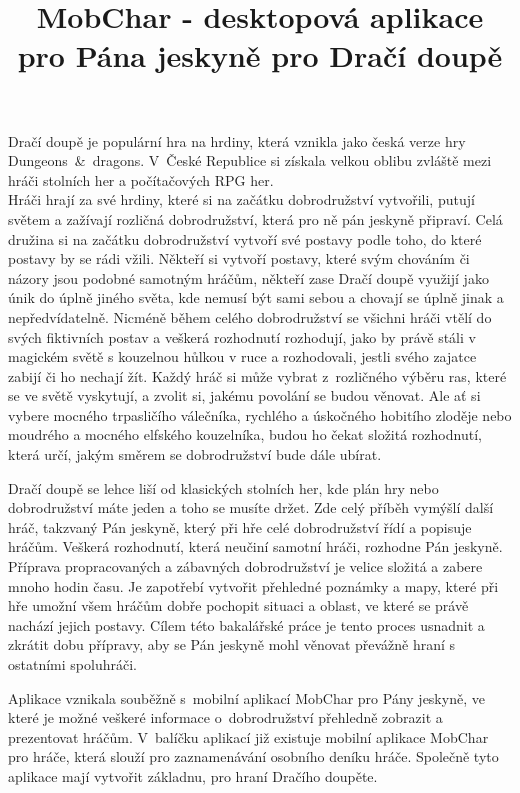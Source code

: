 \documentclass[thesis=B,czech]{resources/FITthesis}[2012/06/26]
\title{	MobChar - desktopová aplikace pro Pána jeskyně pro Dračí doupě}
\begin{document}

\begin{introduction}
Dračí doupě je populární hra na hrdiny, která vznikla jako česká verze hry Dungeons~\&~dragons. V~České Republice si získala velkou oblibu zvláště mezi hráči stolních her a počítačových RPG her.\\

Hráči hrají za své hrdiny, které si na začátku dobrodružství vytvořili, putují světem a zažívají rozličná dobrodružství, která pro ně pán jeskyně připraví. Celá družina si na začátku dobrodružství vytvoří své postavy podle toho, do které postavy by se rádi vžili. Někteří si vytvoří postavy, které svým chováním či názory jsou podobné samotným hráčům, někteří zase Dračí doupě využijí jako únik do úplně jiného světa, kde nemusí být sami sebou a chovají se úplně jinak a nepředvídatelně. Nicméně během celého dobrodružství se všichni hráči vtělí do svých fiktivních postav a veškerá rozhodnutí rozhodují, jako by právě stáli v magickém světě s kouzelnou hůlkou v ruce a rozhodovali, jestli svého zajatce zabijí či ho nechají žít.
Každý hráč si může vybrat z~rozličného výběru ras, které se ve světě vyskytují, a zvolit si, jakému povolání se budou věnovat. Ale ať si vybere mocného trpasličího válečníka, rychlého a úskočného hobitího zloděje nebo moudrého a mocného elfského kouzelníka, budou ho čekat složitá rozhodnutí, která určí, jakým směrem se dobrodružství bude dále ubírat. \par

Dračí doupě se lehce liší od klasických stolních her, kde plán hry nebo dobrodružství máte jeden a toho se musíte držet. Zde celý příběh vymýšlí další hráč, takzvaný Pán jeskyně, který při hře celé dobrodružství řídí a popisuje hráčům. Veškerá rozhodnutí, která neučiní samotní hráči, rozhodne Pán jeskyně. Příprava propracovaných a zábavných dobrodružství je velice složitá a zabere mnoho hodin času. Je zapotřebí vytvořit přehledné poznámky a mapy, které při hře umožní všem hráčům dobře pochopit situaci a oblast, ve které se právě nachází jejich postavy. Cílem této bakalářské práce je tento proces usnadnit a zkrátit dobu přípravy, aby se Pán jeskyně mohl věnovat převážně hraní s ostatními spoluhráči. \par

Aplikace vznikala souběžně s~mobilní aplikací MobChar pro Pány jeskyně\cite{Shanel_2017}, ve které je možné veškeré 	informace o~dobrodružství přehledně zobrazit a prezentovat hráčům. V~balíčku aplikací již existuje mobilní aplikace MobChar pro hráče, která slouží pro zaznamenávání osobního deníku hráče\cite{Weberova_2017}. Společně tyto aplikace mají vytvořit základnu, pro hraní Dračího doupěte. \par



\end{introduction}
\end{document}
